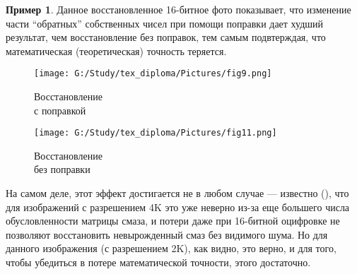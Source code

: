 \documentclass[a4paper]{article}
\theoremstyle{definition}
\newtheorem{example}{Пример}[section]
\begin{document}
\begin{example}

Данное восстановленное 16-битное фото показывает, что изменение части ``обратных'' собственных чисел при помощи поправки дает худший результат, чем восстановление без поправок, тем самым подвтерждая, что математическая (теоретическая) точность теряется.

\hspace*{-\parindent}
\begin{minipage}{80mm}
    \begin{figure}[H]
            \texttt{[image: G:/Study/tex\_diploma/Pictures/fig9.png]}
            \label{Pic9}
            \caption[Восстановление\\с поправкой]{Восстановление\\с поправкой}
        \end{figure}
\end{minipage}
\begin{minipage}{85mm}
    \begin{figure}[H]
            \texttt{[image: G:/Study/tex\_diploma/Pictures/fig11.png]}
            \label{Pic11}
            \caption[Восстановление\\без поправки]{Восстановление\\без поправки}
        \end{figure}
\end{minipage}
\vspace*{2mm}

\end{example}


На самом деле, этот эффект достигается не в любом случае --- известно (\cite{cond}), что для изображений с разрешением 4K это уже неверно из-за еще большего числа обусловленности матрицы смаза, и потери даже при 16-битной оцифровке не позволяют восстановить невырожденный смаз без видимого шума. Но для данного изображения (с разрешением 2K), как видно, это верно, и для того, чтобы убедиться в потере математической точности, этого достаточно.

\newpage
\end{document}
